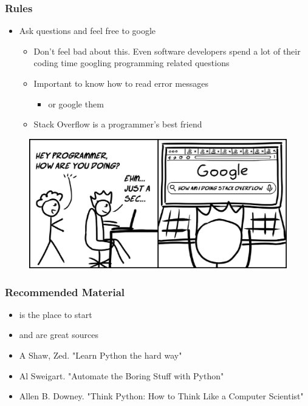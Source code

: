 \documentclass[compress, aspectratio=54]{beamer}
\begin{document}
\begin{frame}
\frametitle{Rules}
\begin{itemize}
\item Ask questions and feel free to google
\begin{itemize}
\item Don't feel bad about this. Even software developers spend a lot of their coding time googling programming related questions
\item Important to know how to read error messages
\begin{itemize}

\item or google them
\end{itemize}
\item Stack Overflow is a programmer's best friend
\end{itemize}
\end{itemize}
\end{frame}


\begin{frame}
\begin{figure}

\includegraphics[width=0.6\linewidth ]{../Figures/stack-overflow.jpeg}
\end{figure}

\end{frame}

\begin{frame}
\frametitle{Recommended Material}
\begin{itemize}
\item \href{https://www.codecademy.com/catalog/language/python}{\color{ blue}{Codecademy}} is the place to start
\item \href{https://automatetheboringstuff.com/}{\color{ blue}{Automate the Boring Stuff with Python}} and \href{https://realpython.com/}{\color{ blue}{The Real Python}} are great sources
\item A Shaw, Zed. "Learn Python the hard way"
\item Al Sweigart. "Automate the Boring Stuff with Python"
\item Allen B. Downey. "Think Python: How to Think Like a Computer Scientist"
\end{itemize}
\end{frame}
\end{document}
